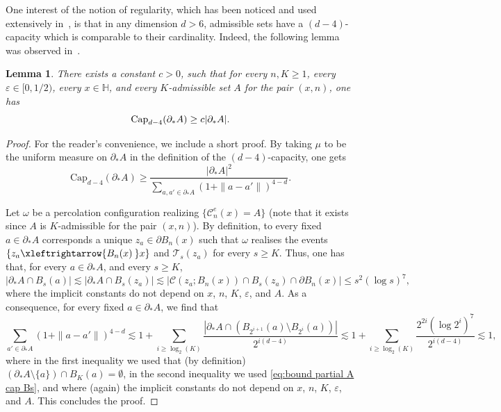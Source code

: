 \documentclass[11pt,a4paper]{article}
\numberwithin{equation}{section}
\theoremstyle{plain}
\newtheorem{Lem}[Thm]{Lemma}
\theoremstyle{definition}
\newcommand{\connect}{\xleftrightarrow}
\begin{document}
One interest of the notion of regularity, which has been noticed and used extensively in~\cite{Asselah2025capacity}, is that in any dimension $d>6$, admissible sets have a $(d-4)$-capacity which is comparable to their cardinality. 
Indeed, the following lemma was observed in~\cite[Claim~6.1]{Asselah2025capacity}. 
\begin{Lem}\label{lem:lowercap}
There exists a constant $c>0$, such that for every $n,K\geq 1$, every $\varepsilon\in [0,1/2)$, every $x\in \mathbb H$, and every $K$-admissible set $A$ for the pair $(x,n)$, 
one has 
\begin{equation}
\textup{Cap}_{d-4}(\partial_*A) \ge c |\partial_*A|. 
\end{equation} 
\end{Lem}
\begin{proof}
For the reader's convenience, we include a short proof. By taking $\mu$ to be the uniform measure on $\partial_*A$ in the definition of the $(d-4)$-capacity, one gets 
\begin{equation}
\textrm{Cap}_{d-4}(\partial_*A) \ge \frac{ |\partial_*A|^2}{\sum_{a,a'\in \partial_*A} (1+\|a-a'\|)^{4-d}}. 
\end{equation}


Let $\omega$ be a percolation configuration realizing $\{\mathcal C_n^e(x)=A\}$ (note that it exists since $A$ is $K$-admissible for the pair $(x,n)$). By definition, to every fixed $a\in \partial_*A$ corresponds a unique $z_a\in \partial B_n(x)$ such that $\omega$ realises the events $\{z_a\connect{B_n(x)\:}x\}$ and $\mathcal T_{s}(z_a)$ for every $s\geq K$. Thus, one has that, for every $a\in \partial_*A$, and every $s\geq K$,
\begin{equation}\label{eq:bound partial A cap Bs}
	|\partial_*A\cap B_s(a)|\lesssim |\partial_*A\cap B_s(z_a)|\lesssim |\mathcal C(z_a;B_n(x))\cap B_s(z_a)\cap \partial B_n(x)|\leq s^2(\log s)^7,
\end{equation}
where the implicit constants do not depend on $x$, $n$, $K$, $\varepsilon$, and $A$. As a consequence, for every fixed $a\in \partial_*A$, we find that
\begin{equation} 
\sum_{a'\in \partial_*A} (1+\|a-a'\|)^{4-d} \lesssim 1+ \sum_{i\geq \log_2(K)}\frac{|\partial_*A\cap (B_{2^{i+1}}(a)\setminus B_{2^i}(a))|}{2^{i(d-4)}}\lesssim 1+\sum_{i \geq \log_2(K)}\frac{2^{2i}(\log 2^i)^7}{2^{i(d-4)}} \lesssim  1,
\end{equation}
where in the first inequality we used that (by definition) $(\partial_*A\setminus \{a\}) \cap B_{K}(a)=\emptyset$, in the second inequality we used \eqref{eq:bound partial A cap Bs}, and where (again) the implicit constants do not depend on $x$, $n$, $K$, $\varepsilon$, and $A$. This concludes the proof. 
\end{proof}   
\end{document}
